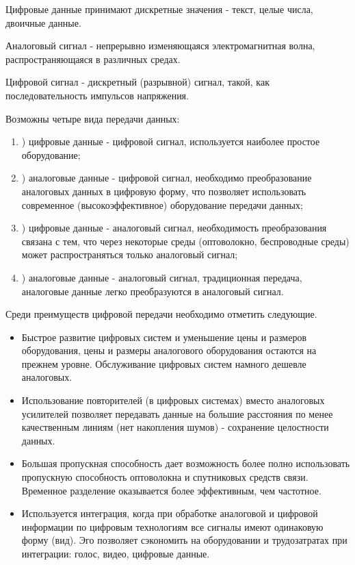 \documentclass[a4paper]{report}
\begin{document}
Цифровые данные принимают дискретные значения - текст, целые числа, двоичные данные.

Аналоговый сигнал - непрерывно изменяющаяся электромагнитная волна, распространяющаяся в различных средах.

Цифровой сигнал - дискретный (разрывной) сигнал, такой, как последовательность импульсов напряжения.

Возможны четыре вида передачи данных:
\begin{enumerate}
\item) цифровые данные - цифровой сигнал, используется наиболее простое оборудование;
\item) аналоговые данные - цифровой сигнал, необходимо преобразование аналоговых данных в цифровую форму, что позволяет использовать современное (высокоэффективное) оборудование передачи данных;
\item) цифровые данные - аналоговый сигнал, необходимость преобразования связана с тем, что через некоторые среды (оптоволокно, беспроводные среды) может распространяться только аналоговый сигнал;
\item) аналоговые данные - аналоговый сигнал, традиционная передача, аналоговые данные легко преобразуются в аналоговый сигнал.
\end{enumerate}

Среди преимуществ цифровой передачи необходимо отметить следующие.
\begin{itemize}
\item \qquad Быстрое развитие цифровых систем и уменьшение цены и размеров оборудования, цены и размеры аналогового оборудования остаются на прежнем уровне. Обслуживание цифровых систем намного дешевле аналоговых.
\item \qquad Использование повторителей (в цифровых системах) вместо аналоговых усилителей позволяет передавать данные на большие расстояния по менее качественным линиям (нет накопления шумов) - сохранение целостности данных.
\item \qquad Большая пропускная способность дает возможность более полно использовать пропускную способность оптоволокна и спутниковых средств связи. Временное разделение оказывается более эффективным, чем частотное.
\item \qquad Используется интеграция, когда при обработке аналоговой и цифровой информации по цифровым технологиям все сигналы имеют одинаковую форму (вид). Эго позволяет сэкономить на оборудовании и трудозатратах при интеграции: голос, видео, цифровые данные.
\end{itemize}
\end{document}
